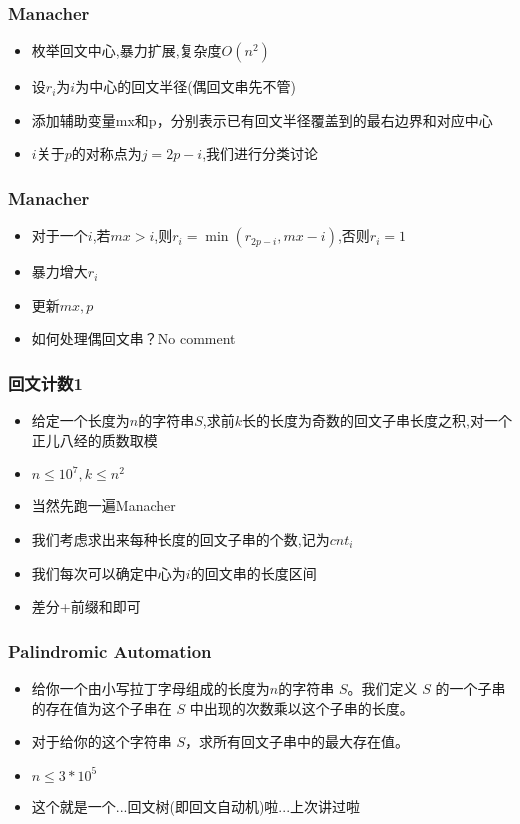 \documentclass[notheorems]{beamer}
\begin{document}
\begin{frame}
\frametitle{Manacher}
\begin{itemize}[]
\item 枚举回文中心,暴力扩展,复杂度$O(n^2)$
\pause
\item 设$r_i$为$i$为中心的回文半径(偶回文串先不管)
\item 添加辅助变量mx和p，分别表示已有回文半径覆盖到的最右边界和对应中心
\pause
\item $i$关于$p$的对称点为$j=2p-i$,我们进行分类讨论
\end{itemize}
\end{frame}

\begin{frame}
\frametitle{Manacher}
\begin{itemize}[]
\item 对于一个$i$,若$mx > i$,则$r_i = \min(r_{2p-i},mx-i)$,否则$r_i = 1$
\pause
\item 暴力增大$r_i$
\pause
\item 更新$mx,p$
\pause
\item 如何处理偶回文串？No comment
\end{itemize}
\end{frame}

\begin{frame}
\frametitle{回文计数1}
\begin{itemize}
\item 给定一个长度为$n$的字符串$S$,求前$k$长的长度为奇数的回文子串长度之积,对一个正儿八经的质数取模
\item $n\leq 10^7,k\leq n^2$
\pause
\item 当然先跑一遍Manacher
\pause
\item 我们考虑求出来每种长度的回文子串的个数,记为$cnt_i$
\pause
\item 我们每次可以确定中心为$i$的回文串的长度区间
\pause
\item 差分+前缀和即可
\end{itemize}
\end{frame}


\begin{frame}
\frametitle{Palindromic Automation}
\begin{itemize}
\item 给你一个由小写拉丁字母组成的长度为$n$的字符串 $S$。我们定义 $S$ 的一个子串的存在值为这个子串在 $S$ 中出现的次数乘以这个子串的长度。
\item 对于给你的这个字符串 $S$，求所有回文子串中的最大存在值。
\item $n\leq 3*10^5$
\pause
\item 这个就是一个...回文树(即回文自动机)啦...上次讲过啦
\end{itemize}
\end{frame}
\end{document}

